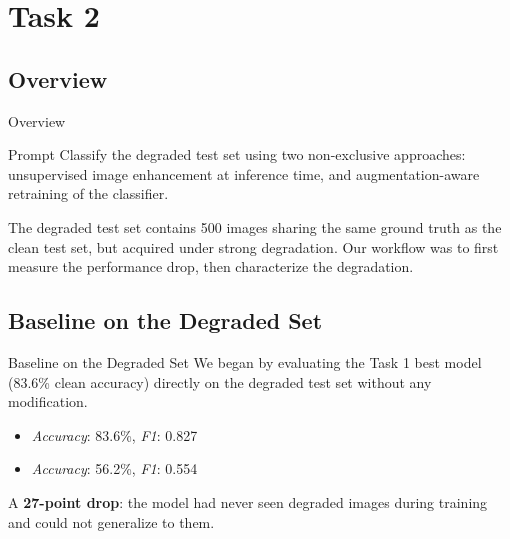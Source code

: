 
\section{Task 2}
\makeatletter{}\makeatother\label{sec:task2}

\subsection{Overview}
\begin{frame}{Overview}
  \begin{block}{Prompt}
    Classify the degraded test set using two non-exclusive approaches:
    unsupervised image enhancement at inference time, and
    augmentation-aware retraining of the classifier.
  \end{block}
  \vspace{\baselineskip}
  The degraded test set contains 500 images sharing the same ground truth as the clean test set,
  but acquired under strong degradation.
  Our workflow was to first measure the performance drop, then characterize the degradation.
\end{frame}

\subsection{Baseline on the Degraded Set}
\begin{frame}{Baseline on the Degraded Set}
  We began by evaluating the Task 1 best model (83.6\% clean accuracy)
  directly on the degraded test set without any modification.
  \vspace{\baselineskip}
  \begin{itemize}
    \item [clean] \textit{Accuracy}: 83.6\%, \textit{F1}: 0.827
    \item [degraded] \textit{Accuracy}: 56.2\%, \textit{F1}: 0.554
  \end{itemize}
  \vspace{0.5\baselineskip}
  A \textbf{27-point drop}: the model had never seen degraded images during training
  and could not generalize to them.
\end{frame}

